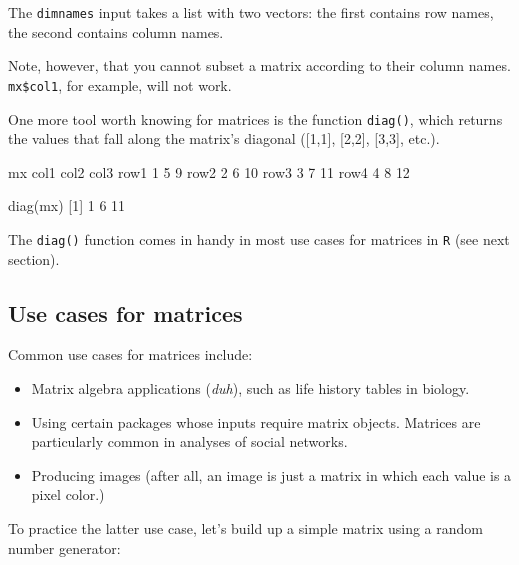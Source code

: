 \documentclass[
]{book}
\newenvironment{Shaded}{\begin{snugshade}}{\end{snugshade}}
\newcommand{\DecValTok}[1]{\textcolor[rgb]{0.00,0.00,0.81}{#1}}
\newcommand{\FunctionTok}[1]{\textcolor[rgb]{0.00,0.00,0.00}{#1}}
\newcommand{\NormalTok}[1]{#1}
\begin{document}
The \texttt{dimnames} input takes a list with two vectors: the first contains row names, the second contains column names.

Note, however, that you cannot subset a matrix according to their column names. \texttt{mx\$col1}, for example, will not work.

One more tool worth knowing for matrices is the function \texttt{diag()}, which returns the values that fall along the matrix's diagonal ({[}1,1{]}, {[}2,2{]}, {[}3,3{]}, etc.).

\begin{Shaded}
\begin{Highlighting}[]
\NormalTok{mx}
\NormalTok{     col1 col2 col3}
\NormalTok{row1    }\DecValTok{1}    \DecValTok{5}    \DecValTok{9}
\NormalTok{row2    }\DecValTok{2}    \DecValTok{6}   \DecValTok{10}
\NormalTok{row3    }\DecValTok{3}    \DecValTok{7}   \DecValTok{11}
\NormalTok{row4    }\DecValTok{4}    \DecValTok{8}   \DecValTok{12}

\FunctionTok{diag}\NormalTok{(mx)}
\NormalTok{[}\DecValTok{1}\NormalTok{]  }\DecValTok{1}  \DecValTok{6} \DecValTok{11}
\end{Highlighting}
\end{Shaded}

The \texttt{diag()} function comes in handy in most use cases for matrices in \texttt{R} (see next section).

\hypertarget{use-cases-for-matrices}{%
\subsection*{Use cases for matrices}\label{use-cases-for-matrices}}

Common use cases for matrices include:

\begin{itemize}
\item
  Matrix algebra applications (\emph{duh}), such as life history tables in biology.
\item
  Using certain packages whose inputs require matrix objects. Matrices are particularly common in analyses of social networks.
\item
  Producing images (after all, an image is just a matrix in which each value is a pixel color.)
\end{itemize}

To practice the latter use case, let's build up a simple matrix using a random number generator:
\end{document}
